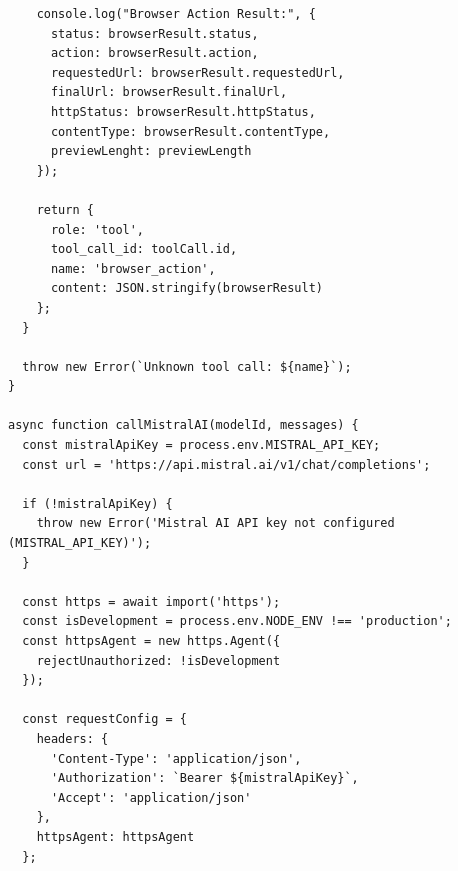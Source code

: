 \begin{lstlisting}
    console.log("Browser Action Result:", {
      status: browserResult.status,
      action: browserResult.action,
      requestedUrl: browserResult.requestedUrl,
      finalUrl: browserResult.finalUrl,
      httpStatus: browserResult.httpStatus,
      contentType: browserResult.contentType,
      previewLenght: previewLength
    });

    return {
      role: 'tool',
      tool_call_id: toolCall.id,
      name: 'browser_action',
      content: JSON.stringify(browserResult)
    };
  }

  throw new Error(`Unknown tool call: ${name}`);
}

async function callMistralAI(modelId, messages) {
  const mistralApiKey = process.env.MISTRAL_API_KEY;
  const url = 'https://api.mistral.ai/v1/chat/completions';

  if (!mistralApiKey) {
    throw new Error('Mistral AI API key not configured (MISTRAL_API_KEY)');
  }

  const https = await import('https');
  const isDevelopment = process.env.NODE_ENV !== 'production';
  const httpsAgent = new https.Agent({
    rejectUnauthorized: !isDevelopment
  });

  const requestConfig = {
    headers: {
      'Content-Type': 'application/json',
      'Authorization': `Bearer ${mistralApiKey}`,
      'Accept': 'application/json'
    },
    httpsAgent: httpsAgent
  };


\end{lstlisting}
